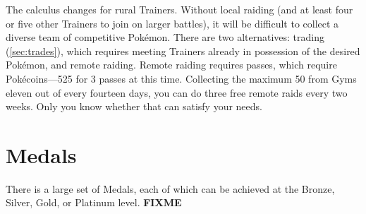 The calculus changes for rural Trainers.
Without local raiding (and at least four or five other Trainers to join on larger battles),
  it will be difficult to collect a diverse team of competitive Pokémon.
There are two alternatives: trading (\autoref{sec:trades}), which requires meeting Trainers
  already in possession of the desired Pokémon, and remote raiding.
Remote raiding requires passes, which require Pokécoins---525 for 3 passes at this time.
Collecting the maximum 50 from Gyms eleven out of every fourteen days, you can do
  three free remote raids every two weeks.
Only you know whether that can satisfy your needs.

\section{Medals}
\label{sec:medals}
There is a large set of Medals, each of which can be achieved at the Bronze,
 Silver, Gold, or Platinum level.
\textbf{FIXME}
